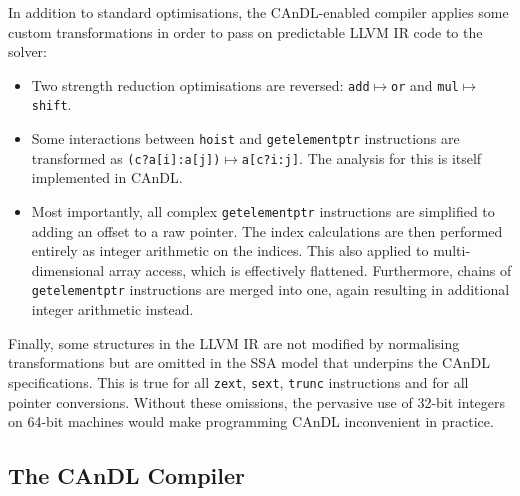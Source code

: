     In addition to standard optimisations, the CAnDL-enabled compiler applies
    some custom transformations in order to pass on predictable LLVM IR code
    to the solver:
    \begin{itemize}
        \item Two strength reduction optimisations are reversed:
              {\tt add}$\mapsto${\tt or} and {\tt mul}$\mapsto${\tt shift}.
        \item Some interactions between {\tt hoist} and {\tt getelementptr}
              instructions are transformed as
              {\tt (c?a[i]:a[j])}$\mapsto${\tt a[c?i:j]}.
              The analysis for this is itself implemented in CAnDL.
        \item Most importantly, all complex {\tt getelementptr} instructions are 
              simplified to adding an offset to a raw pointer.
              The index calculations are then performed entirely as integer
              arithmetic on the indices.
              This also applied to multi-dimensional array access, which is
              effectively flattened.
              Furthermore, chains of {\tt getelementptr} instructions are merged
              into one, again resulting in additional integer arithmetic
              instead.
    \end{itemize}
    Finally, some structures in the LLVM IR are not modified by normalising
    transformations but are omitted in the SSA model that underpins the
    CAnDL specifications.
    This is true for all {\tt zext}, {\tt sext}, {\tt trunc} instructions and
    for all pointer conversions.
    Without these omissions, the pervasive use of 32-bit integers on 64-bit
    machines would make programming CAnDL inconvenient in practice.

\pagebreak
\subsection{The CAnDL Compiler}

